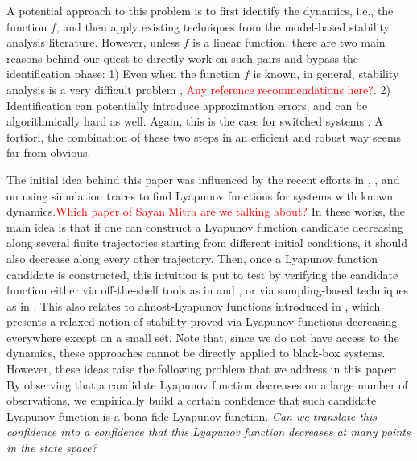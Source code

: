 A potential approach to this problem is to first identify the dynamics, i.e., the function $f$, and then apply existing techniques from the model-based stability analysis literature. However, unless $f$ is a linear function, there are two main reasons behind our quest to directly work on such pairs and bypass the identification phase: 1) Even when the function $f$ is known, in general, stability analysis is a very difficult problem \cite{stabilityHard1}, \textcolor{red}{Any reference recommendations here?}. 2) Identification can potentially introduce approximation errors, and can be algorithmically hard as well. Again, this is the case for switched systems \cite{lauer}. A fortiori, the combination of these two steps in an efficient and robust way seems far from obvious.

The initial idea behind this paper was influenced by the recent efforts in \cite{topcu}, \cite{kapinski}, and \cite{lazar} on using simulation traces to find Lyapunov functions for systems with known dynamics.\textcolor{red}{Which paper of Sayan Mitra are we talking about?} In these works, the main idea is that if one can construct a Lyapunov function candidate decreasing along several finite trajectories starting from different initial conditions, it should also decrease along every other trajectory. Then, once a Lyapunov function candidate is constructed, this intuition is put to test by verifying the candidate function either via off-the-shelf tools as in \cite{topcu} and \cite{kapinski}, or via sampling-based techniques as in \cite{lazar}. This also relates to almost-Lyapunov functions introduced in \cite{liberzon}, which presents a relaxed notion of stability proved via Lyapunov functions decreasing everywhere except on a small set. Note that, since we do not have access to the dynamics, these approaches cannot be directly applied to black-box systems. However, these ideas raise the following problem that we address in this paper: By observing that a candidate Lyapunov function decreases on a large number of observations, we empirically build a certain confidence that such candidate Lyapunov function is a bona-fide Lyapunov function. \emph{Can we translate this confidence into a confidence that this Lyapunov function decreases at many points in the state space?} 

